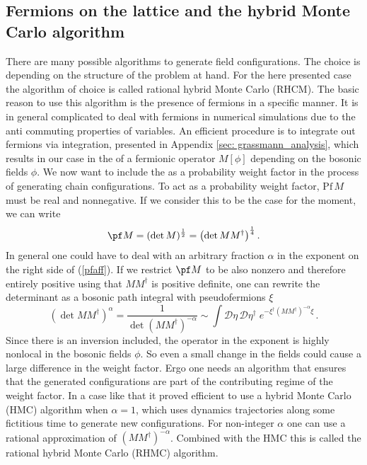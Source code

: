 \subsection{Fermions on the lattice and the hybrid Monte Carlo algorithm}
\label{sec: hmc_alg}
%
%
There are many possible algorithms to generate field configurations. The choice is depending on the structure of the problem at hand. For the here presented case the algorithm of choice is called rational hybrid Monte Carlo (RHCM). The basic reason to use this algorithm is the presence of fermions in a specific manner. It is in general complicated to deal with fermions in numerical simulations due to the anti commuting properties of  variables. An efficient procedure is to integrate out fermions via  integration, presented in Appendix \ref{sec: grassmann_analysis}, which results in our case in the  of a fermionic operator $M[\phi]$ depending on the bosonic fields $\phi$. We now want to include the  as a probability weight factor in the process of generating  chain configurations. To act as a probability weight factor, $\text{Pf}\,M$ must be real and nonnegative. If we consider this to be the case for the moment, we can write
%
%
\begin{equation}
\pf M = (\det M)^{\frac{1}{2}} = \left( \det MM^{\dagger}\right)^{\frac{1}{4}} .
\label{pfaff}
\end{equation}
%
%
In general one could have to deal with an arbitrary fraction $\alpha$ in the exponent on the right side of (\ref{pfaff}). If we restrict $\pf M$ to be also nonzero and therefore entirely positive using that $MM^{\dagger}$ is positive definite, one can rewrite the determinant as a bosonic path integral with pseudofermions $\xi$
%
%
\begin{equation}
\left( \det MM^{\dagger}\right)^{\alpha} = \dfrac{1}{\det \left(MM^{\dagger}\right)^{-\alpha}} \sim \int \mathcal{D}\eta\,\mathcal{D}\eta^{\dagger}\; e^{-\xi^{\dagger}(MM^{\dagger})^{-\alpha}\xi}\, .
\end{equation}
%
%
Since there is an inversion included, the operator in the exponent is highly nonlocal in the bosonic fields $\phi$. So even a small change in the fields could cause a large difference in the weight factor. Ergo one needs an algorithm that ensures that the generated configurations are part of the contributing regime of the weight factor. In a case like that it proved efficient to use a hybrid Monte Carlo (HMC) algorithm when $\alpha=1$, which uses  dynamics trajectories along some fictitious time to generate new configurations. For non-integer $\alpha$ one can use a rational approximation of $\left(MM^{\dagger}\right)^{-\alpha}$. Combined with the HMC this is called the rational hybrid Monte Carlo (RHMC) algorithm.\\
